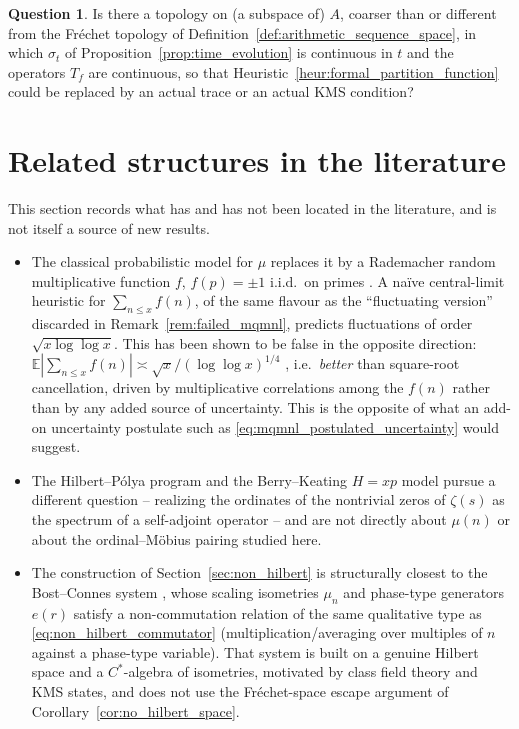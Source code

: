 \documentclass[11pt]{amsart}
\numberwithin{equation}{section}
\theoremstyle{plain}
\theoremstyle{definition}
\newtheorem{question}[theorem]{Question}
\theoremstyle{remark}
\begin{document}
\begin{question}
\label{q:flow_continuity}
Is there a topology on (a subspace of) $A$, coarser than or different
from the Fr\'echet topology of
Definition~\ref{def:arithmetic_sequence_space}, in which $\sigma_t$ of
Proposition~\ref{prop:time_evolution} is continuous in $t$ and the
operators $T_f$ are continuous, so that
Heuristic~\ref{heur:formal_partition_function} could be replaced by an
actual trace or an actual KMS condition?
\end{question}

\section{Related structures in the literature}
\label{sec:literature}

This section records what has and has not been located in the
literature, and is not itself a source of new results.

\begin{itemize}[leftmargin=*]

\item The classical probabilistic model for $\mu$ replaces it by a
Rademacher random multiplicative function $f$, $f(p)=\pm1$ i.i.d.\ on
primes \cite{Wintner1944}. A na\"ive central-limit heuristic for
$\sum_{n\le x}f(n)$, of the same flavour as the ``fluctuating version''
discarded in Remark~\ref{rem:failed_mqmnl}, predicts fluctuations of
order $\sqrt{x\log\log x}$. This has been shown to be false in the
opposite direction: $\mathbb{E}\left|\sum_{n\le x}f(n)\right|\asymp
\sqrt{x}/(\log\log x)^{1/4}$ \cite{Harper2020}, i.e.\ \emph{better}
than square-root cancellation, driven by multiplicative correlations
among the $f(n)$ rather than by any added source of uncertainty. This
is the opposite of what an add-on uncertainty postulate such as
\eqref{eq:mqmnl_postulated_uncertainty} would suggest.

\item The Hilbert--P\'olya program and the Berry--Keating $H=xp$
model \cite{BerryKeating1999} pursue a different question -- realizing
the ordinates of the nontrivial zeros of $\zeta(s)$ as the spectrum of
a self-adjoint operator -- and are not directly about $\mu(n)$ or about
the ordinal--M\"obius pairing studied here.

\item The construction of Section~\ref{sec:non_hilbert} is structurally
closest to the Bost--Connes system \cite{BostConnes1995}, whose scaling
isometries $\mu_n$ and phase-type generators $e(r)$ satisfy a
non-commutation relation of the same qualitative type as
\eqref{eq:non_hilbert_commutator} (multiplication/averaging over
multiples of $n$ against a phase-type variable). That system is built
on a genuine Hilbert space and a $C^*$-algebra of isometries, motivated
by class field theory and KMS states, and does not use the
Fr\'echet-space escape argument of
Corollary~\ref{cor:no_hilbert_space}.

\end{itemize}
\end{document}
